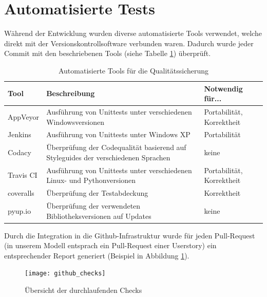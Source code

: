 \section{Automatisierte Tests}
Während der Entwicklung wurden diverse automatisierte Tools verwendet, welche direkt mit der Versionskontrollsoftware
verbunden waren. Dadurch wurde jeder Commit mit den beschriebenen Tools (siehe Tabelle \ref{qs_tools}) überprüft.
\begin{table}[H]
	\centering
	\begin{tabular}{|l|p{18em}|l|}
		\hline
		\textbf{Tool} & \textbf{Beschreibung} & \textbf{Notwendig für...} \\\hline
		AppVeyor & Ausführung von Unittests unter verschiedenen Windowsversionen & Portabilität, Korrektheit \\\hline
		Jenkins & Ausführung von Unittests unter Windows XP& Portabilität \\\hline
		Codacy & Überprüfung der Codequalität basierend auf Styleguides der verschiedenen Sprachen& keine \\\hline
		Travis CI & Ausführung von Unittests unter verschiedenen Linux- und Pythonversionen & Portabilität, Korrektheit \\\hline
		coveralls & Überprüfung der Testabdeckung & Korrektheit \\\hline
		pyup.io & Überprüfung der verwendeten Bibliotheksversionen auf Updates & keine \\\hline
	\end{tabular}
	\caption{Automatisierte Tools für die Qualitätssicherung}
	\label{qs_tools}
\end{table}

Durch die Integration in die Github-Infrastruktur wurde für jeden Pull-Request (in unserem Modell entsprach ein Pull-Request einer Userstory)
ein entsprechender Report generiert (Beispiel in Abbildung \ref{github_checks}).

\begin{figure}[h]
	\centering
	\texttt{[image: github\_checks]}
	\caption{Übersicht der durchlaufenden Checks}
	\label{github_checks}
\end{figure}

